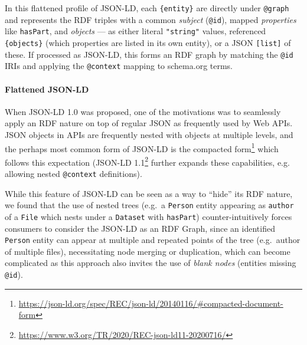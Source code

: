  

In this flattened profile of JSON-LD, each \texttt{\{entity\}} are
directly under \texttt{@graph} and represents the RDF triples with a
common \emph{subject} (\texttt{@id}), mapped \emph{properties} like
\texttt{hasPart}, and \emph{objects} --- as either literal
\texttt{"string"} values, referenced \texttt{\{objects\}} (which
properties are listed in its own entity), or a JSON \texttt{{[}list{]}}
of these. If processed as JSON-LD, this forms an RDF graph by matching
the \texttt{@id} IRIs and applying the \texttt{@context} mapping to
schema.org terms. \normalsize

\paragraph{Flattened JSON-LD}\label{ch5:flattened-json-ld}

When JSON-LD 1.0 \cite{w3-ldp}
was
proposed, one of the motivations was to seamlessly apply an RDF nature
on top of regular JSON as frequently used by Web APIs. JSON objects in
APIs are frequently nested with objects at multiple levels, and the
perhaps most common form of JSON-LD is the compacted
form\footnote{\url{https://json-ld.org/spec/REC/json-ld/20140116/\#compacted-document-form}}
which follows this expectation (JSON-LD
1.1\footnote{\url{https://www.w3.org/TR/2020/REC-json-ld11-20200716/}} further
expands these capabilities, e.g. allowing nested \texttt{@context} definitions).


While this feature of JSON-LD can be seen as a way to ``hide'' its RDF
nature, we found that the use of nested trees (e.g.~a \texttt{Person}
entity appearing as \texttt{author} of a \texttt{File} which nests under
a \texttt{Dataset} with \texttt{hasPart}) counter-intuitively forces
consumers to consider the JSON-LD as an RDF Graph, since an identified
\texttt{Person} entity can appear at multiple and repeated points of the
tree (e.g.~author of multiple files), necessitating node merging or
duplication, which can become complicated as this approach also invites
the use of \emph{blank nodes} (entities missing \texttt{@id}).


